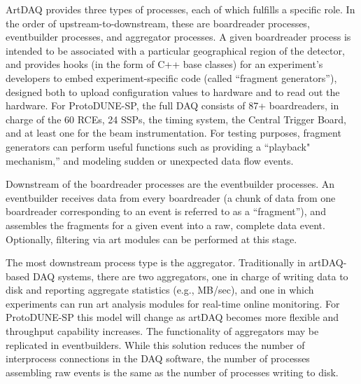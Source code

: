 ArtDAQ provides three types of processes, each of which
fulfills a specific role. In the order of upstream-to-downstream, these
are boardreader processes, eventbuilder processes, and aggregator
processes. A given boardreader process is intended to be associated 
with a particular geographical region of the detector, and provides
hooks (in the form of C++ base classes) for an experiment's developers
to embed experiment-specific code (called ``fragment generators''),
designed both to upload configuration values to hardware and to read
out the hardware. For ProtoDUNE-SP, the full DAQ consists of 87+ 
boardreaders, in charge of the 60 RCEs, 24 SSPs, the timing system, 
the Central Trigger Board, and at least one for the beam instrumentation.
For testing purposes, fragment generators can perform useful
functions such as providing a ``playback" mechanism,'' and modeling sudden or unexpected data flow events.

Downstream of the boardreader processes are the eventbuilder
processes. An eventbuilder receives data from every boardreader (a
chunk of data from one boardreader corresponding to an event is
referred to as a ``fragment''), and assembles the fragments for a given
event into a raw, complete data event. Optionally, filtering via art
modules can be performed at this stage.

The most downstream process type is the aggregator. Traditionally in
artDAQ-based DAQ systems, there are two aggregators, one in charge of
writing data to disk and reporting aggregate statistics (e.g., MB/sec), and one in which 
experiments can run art analysis modules for
real-time online monitoring. 
%
%
For ProtoDUNE-SP this model will change as
artDAQ becomes more flexible and throughput
capability increases. The functionality
of aggregators may be replicated in eventbuilders. While this solution  reduces
the number of interprocess connections in the DAQ software, the number of
processes assembling raw events is the same as the number of processes
writing to disk.


